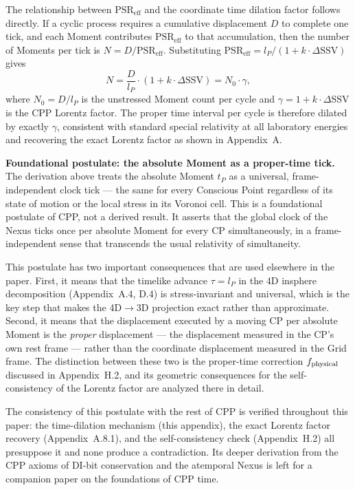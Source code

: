 \documentclass[11pt,letterpaper]{article}
\begin{document}
The relationship between $\text{PSR}_{\text{eff}}$ and the coordinate time dilation factor follows directly. If a cyclic process requires a 
cumulative displacement $D$ to complete one tick, and each Moment contributes $\text{PSR}_{\text{eff}}$ to that accumulation, then the 
number of Moments per tick is $N = D / \text{PSR}_{\text{eff}}$. 
Substituting $\text{PSR}_{\text{eff}} = l_P / (1 + k \cdot \Delta\text{SSV})$ gives
\[
N = \frac{D}{l_P} \cdot (1 + k \cdot \Delta\text{SSV}) = N_0 \cdot \gamma,
\]
where $N_0 = D/l_P$ is the unstressed Moment count per cycle and $\gamma = 1 + k \cdot \Delta\text{SSV}$ is the CPP Lorentz factor. The proper time interval per cycle is therefore dilated by exactly $\gamma$, consistent with standard special relativity at all laboratory energies and recovering the exact Lorentz factor as shown in Appendix~A.

\textbf{Foundational postulate: the absolute Moment as a proper-time tick.}
The derivation above treats the absolute Moment $t_P$ as a universal, frame-independent clock tick — the same for every Conscious Point 
regardless of its state of motion or the local stress in its Voronoi cell. This is a foundational postulate of CPP, not a derived result. It asserts that the global clock of the Nexus ticks once per absolute Moment for every CP simultaneously, in a frame-independent sense that transcends the usual relativity of simultaneity.

This postulate has two important consequences that are used elsewhere in the paper. First, it means that the timelike advance $\tau = l_P$ in the 4D insphere decomposition (Appendix~A.4, D.4) is stress-invariant and universal, which is the key step that makes the 4D$\to$3D projection exact rather than approximate. Second, it means that the displacement executed by a moving CP per absolute Moment is the \emph{proper} displacement — the displacement measured in the CP's own rest frame — rather than the coordinate displacement measured in the Grid frame. The distinction between these two is the proper-time correction $f_{\rm physical}$ discussed in Appendix~H.2, and its geometric consequences for the self-consistency of the Lorentz factor are analyzed there in detail.

The consistency of this postulate with the rest of CPP is verified throughout this paper: the time-dilation mechanism (this appendix), the 
exact Lorentz factor recovery (Appendix~A.8.1), and the self-consistency check (Appendix~H.2) all presuppose it and none produce a contradiction. 
Its deeper derivation from the CPP axioms of DI-bit conservation and the atemporal Nexus is left for a companion paper on the foundations of CPP 
time.
\end{document}
